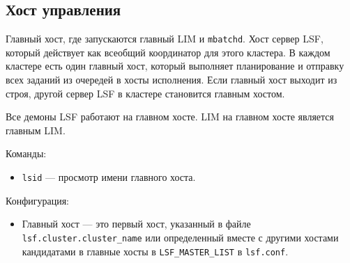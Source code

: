 \subsection{Хост управления}

Главный хост, где запускаются главный LIM и \lstinline{mbatchd}. Хост сервер LSF, который действует как всеобщий координатор для этого кластера. В каждом кластере есть один главный хост, который выполняет планирование и отправку всех заданий из очередей в хосты исполнения. Если главный хост выходит из строя, другой сервер LSF в кластере становится главным хостом.

Все демоны LSF работают на главном хосте. LIM на главном хосте является главным LIM.

Команды:

\begin{itemize}
    \item \lstinline{lsid} --- просмотр имени главного хоста.
\end{itemize}

Конфигурация:

\begin{itemize}
    \item Главный хост --- это первый хост, указанный в файле \lstinline{lsf.cluster.cluster_name} или определенный вместе с другими хостами кандидатами в главные хосты в \lstinline{LSF_MASTER_LIST} в \lstinline{lsf.conf}.
\end{itemize}

\clearpage